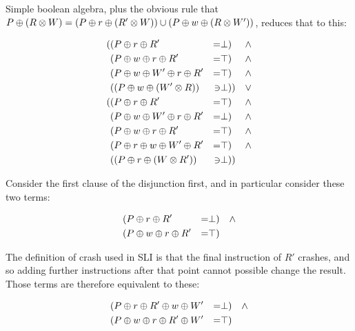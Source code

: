Simple boolean algebra, plus the obvious rule that $P \oplus (R \otimes W) = (P \oplus r \oplus (R' \otimes W) ) \cup (P \oplus w \oplus (R \otimes W') ) $, reduces that to this:

\begin{align*}
( & (P \oplus r \oplus R' & = & \bot) & \wedge \\
  & (P \oplus w \oplus r \oplus R' & = & \top) & \wedge \\
  & (P \oplus w \oplus W' \oplus r \oplus R' & = & \top) & \wedge \\
  & ((P \oplus w \oplus (W' \otimes R)) & \ni & \bot)) & \vee \\
( & (P \oplus r \oplus R' & = & \top) & \wedge \\
  & (P \oplus w \oplus W' \oplus r \oplus R' & = & \bot) & \wedge \\
  & (P \oplus w \oplus r \oplus R' & = & \top) & \wedge \\
  & (P \oplus r \oplus w \oplus W' \oplus R' & = & \top) & \wedge \\
  & ((P \oplus r \oplus (W \otimes R')) & \ni & \bot))
\end{align*}

Consider the first clause of the disjunction first, and in particular consider these two terms:

\begin{align*}
 & (P \oplus r \oplus R' & = & \bot) & \wedge \\
 & (P \oplus w \oplus r \oplus R' & = & \top)
\end{align*}

The definition of crash used in SLI is that the final instruction of $R'$ crashes, and so adding further instructions after that point cannot possible change the result.
Those terms are therefore equivalent to these:

\begin{align*}
 & (P \oplus r \oplus R' \oplus w \oplus W' & = & \bot) & \wedge \\
 & (P \oplus w \oplus r \oplus R' \oplus W' & = & \top)
\end{align*}

